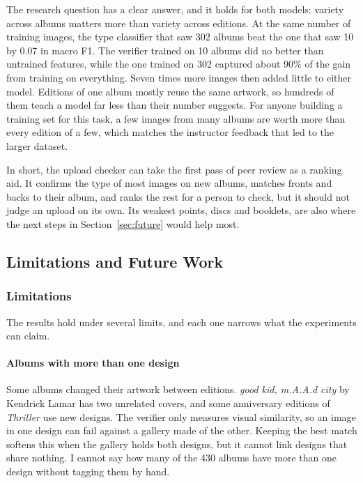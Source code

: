 \documentclass[conference]{IEEEtran}
\begin{document}
The research question has a clear answer, and it holds for both models: variety across albums matters more than variety across editions. At the same number of training images, the type classifier that saw 302 albums beat the one that saw 10 by 0.07 in macro F1. The verifier trained on 10 albums did no better than untrained features, while the one trained on 302 captured about 90\% of the gain from training on everything. Seven times more images then added little to either model. Editions of one album mostly reuse the same artwork, so hundreds of them teach a model far less than their number suggests. For anyone building a training set for this task, a few images from many albums are worth more than every edition of a few, which matches the instructor feedback that led to the larger dataset.

In short, the upload checker can take the first pass of peer review as a ranking aid. It confirms the type of most images on new albums, matches fronts and backs to their album, and ranks the rest for a person to check, but it should not judge an upload on its own. Its weakest points, discs and booklets, are also where the next steps in Section~\ref{sec:future} would help most.

\subsection{Limitations and Future Work}\label{sec:limitations}

\subsubsection{Limitations}\label{sec:limits}
The results hold under several limits, and each one narrows what the experiments can claim.

\paragraph{Albums with more than one design} Some albums changed their artwork between editions. \textit{good kid, m.A.A.d city} by Kendrick Lamar has two unrelated covers, and some anniversary editions of \textit{Thriller} use new designs. The verifier only measures visual similarity, so an image in one design can fail against a gallery made of the other. Keeping the best match softens this when the gallery holds both designs, but it cannot link designs that share nothing. I cannot say how many of the 430 albums have more than one design without tagging them by hand.
\end{document}
